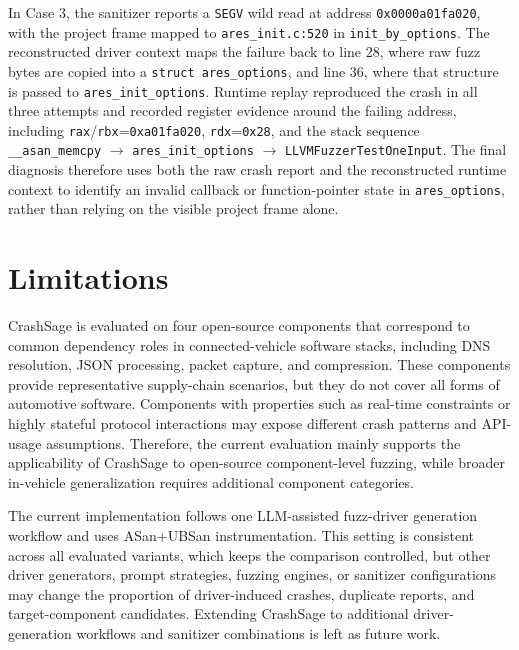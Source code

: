 \documentclass[pdflatex,sn-basic]{sn-jnl}%
\theoremstyle{thmstyleone}%
\theoremstyle{thmstyletwo}%
\theoremstyle{thmstylethree}%
\begin{document}
In Case 3, the sanitizer reports a \texttt{SEGV} wild read at address \texttt{0x0000a01fa020}, with the project frame mapped to \texttt{ares\_init.c:520} in \texttt{init\_by\_options}.
The reconstructed driver context maps the failure back to line 28, where raw fuzz bytes are copied into a \texttt{struct ares\_options}, and line 36, where that structure is passed to \texttt{ares\_init\_options}.
Runtime replay reproduced the crash in all three attempts and recorded register evidence around the failing address, including \texttt{rax}/\texttt{rbx}=\texttt{0xa01fa020}, \texttt{rdx}=\texttt{0x28}, and the stack sequence \texttt{\_\_asan\_memcpy} $\rightarrow$ \texttt{ares\_init\_options} $\rightarrow$ \texttt{LLVMFuzzerTestOneInput}.
The final diagnosis therefore uses both the raw crash report and the reconstructed runtime context to identify an invalid callback or function-pointer state in \texttt{ares\_options}, rather than relying on the visible project frame alone.

\FloatBarrier

\section{Limitations}
\label{sec:limitations}

CrashSage is evaluated on four open-source components that correspond to common dependency roles in connected-vehicle software stacks, including DNS resolution, JSON processing, packet capture, and compression. These components provide representative supply-chain scenarios, but they do not cover all forms of automotive software. Components with properties such as real-time constraints or highly stateful protocol interactions may expose different crash patterns and API-usage assumptions. Therefore, the current evaluation mainly supports the applicability of CrashSage to open-source component-level fuzzing, while broader in-vehicle generalization requires additional component categories.

The current implementation follows one LLM-assisted fuzz-driver generation workflow and uses ASan+UBSan instrumentation. This setting is consistent across all evaluated variants, which keeps the comparison controlled, but other driver generators, prompt strategies, fuzzing engines, or sanitizer configurations may change the proportion of driver-induced crashes, duplicate reports, and target-component candidates. Extending CrashSage to additional driver-generation workflows and sanitizer combinations is left as future work.
\end{document}
